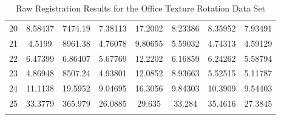 \begin{center}
\begin{longtable}{cccccccc}
20 & 8.58437 & 7474.19 & 7.38113 & 17.2002 & 8.23386 & 8.35952 & 7.93491\\
21 & 4.5199 & 8961.38 & 4.76078 & 9.80655 & 5.59032 & 4.74313 & 4.59129\\
22 & 6.47399 & 6.86407 & 5.67769 & 12.2202 & 6.16859 & 6.24262 & 5.58794\\
23 & 4.86948 & 8507.24 & 4.93801 & 12.0852 & 8.93663 & 5.52515 & 5.11787\\
24 & 11.1138 & 19.5952 & 9.04695 & 16.3056 & 9.84303 & 10.3909 & 9.54403\\
25 & 33.3779 & 365.979 & 26.0885 & 29.635 & 33.284 & 35.4616 & 27.3845\\
\caption{Raw Registration Results for the Office Texture Rotation Data Set}
\label{tab:officetexturerotationFULL}
\end{longtable}
\end{center}



